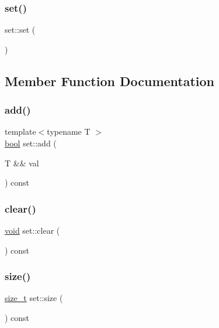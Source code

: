 \subsubsection{\texorpdfstring{set()}{set()}}
{\footnotesize\ttfamily set\+::set (\begin{DoxyParamCaption}{ }\end{DoxyParamCaption})\hspace{0.3cm}{\ttfamily [inline]}}



\subsection{Member Function Documentation}
\mbox{\label{classset_a3ffbfe51196f7032c1605c10a1cfe35a}} 
\subsubsection{\texorpdfstring{add()}{add()}}
{\footnotesize\ttfamily template$<$typename T $>$ \\
\mbox{\hyperlink{asdl_8h_af6a258d8f3ee5206d682d799316314b1}{bool}} set\+::add (\begin{DoxyParamCaption}\item[{T \&\&}]{val }\end{DoxyParamCaption}) const\hspace{0.3cm}{\ttfamily [inline]}}

\mbox{\label{classset_ad19a86d7faa035b3561835fcb3cef758}} 
\subsubsection{\texorpdfstring{clear()}{clear()}}
{\footnotesize\ttfamily \mbox{\hyperlink{_s_d_l__opengles2__gl2ext_8h_ae5d8fa23ad07c48bb609509eae494c95}{void}} set\+::clear (\begin{DoxyParamCaption}{ }\end{DoxyParamCaption}) const\hspace{0.3cm}{\ttfamily [inline]}}

\mbox{\label{classset_a3984afa9c391124b55643dee185c18a6}} 
\subsubsection{\texorpdfstring{size()}{size()}}
{\footnotesize\ttfamily \mbox{\hyperlink{detail_2common_8h_a801d6a451a01953ef8cbae6feb6a3638}{size\+\_\+t}} set\+::size (\begin{DoxyParamCaption}{ }\end{DoxyParamCaption}) const\hspace{0.3cm}{\ttfamily [inline]}}



